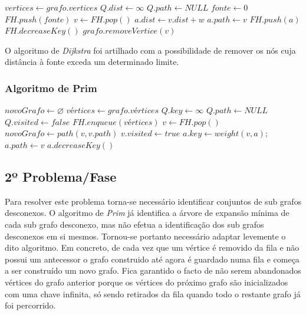 \documentclass[a4paper,12pt,titlepage]{article}
\begin{document}
\begin{algorithmic}[1]
\State $vertices \gets grafo.vertices$
\State $Q.dist \gets \infty$
\State $Q.path \gets NULL$
\EndFor
\State $fonte \gets 0$
\State $FH.push(fonte)$
\State $v \gets FH.pop()$
	\State $a.dist \gets v.dist + w$
	\State $a.path \gets v$
		\State $FH.push(a)$
	\Else
		\State $FH.decreaseKey()$
	\EndIf
\EndIf
\EndFor
\EndWhile
\EndProcedure
{}
\State $grafo.removeVertice(v)$
\EndIf
\EndFor
\EndProcedure
\end{algorithmic}

O algoritmo de \emph{Dijkstra} foi artilhado com a possibilidade de remover os nós cuja distância à fonte exceda um determinado limite.

\subsubsection{Algoritmo de Prim}
\begin{algorithmic}[1]
\State $novoGrafo \gets \varnothing$
\State $vértices \gets grafo.vértices$
\State $Q.key \gets \infty$
\State $Q.path \gets NULL$
\State $Q.visited \gets false$
\EndFor
\State $FH.enqueue(vértices)$
\State $v \gets FH.pop()$
\State $novoGrafo \gets path(v, v.path)$
\State $v.visited \gets true$
\State $a.key \gets weight(v,a)$;
\State $a.path \gets v$
\State $a.decreaseKey()$
\EndIf
\EndFor
\EndWhile
\EndProcedure

\end{algorithmic}


\subsection{2º Problema/Fase}
Para resolver este problema torna-se necessário identificar conjuntos de sub grafos desconexos. O algoritmo de \emph{Prim} já identifica a árvore de expansão mínima de cada sub grafo desconexo, mas não efetua a identificação dos sub grafos desconexos em si mesmos. Tornou-se portanto necessário adaptar levemente o dito algoritmo. Em concreto, de cada vez que um vértice é removido da fila e não possui um antecessor o grafo construido até agora é guardado numa fila e começa a ser construído um novo grafo. Fica garantido o facto de não serem abandonados vértices do grafo anterior porque os vértices do próximo grafo são inicializados com uma chave infinita, só sendo retirados da fila quando todo o restante grafo já foi percorrido.
\end{document}
